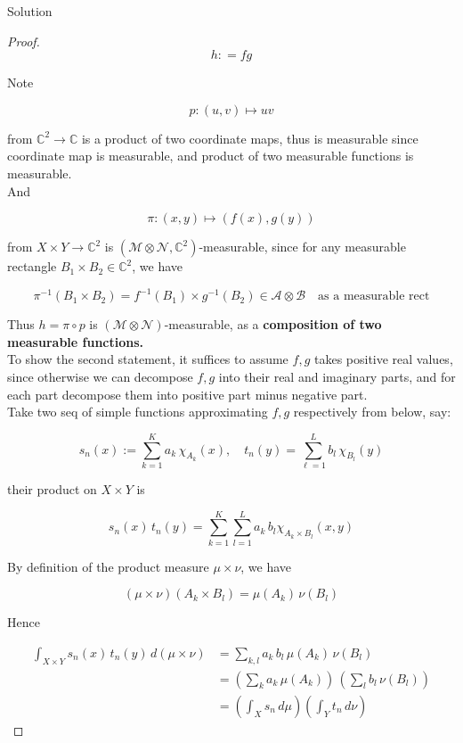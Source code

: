 \documentclass{qlnotes-export}
\begin{document}
\begin{qlsolution}{Solution}
\begin{proof}
\[h: = fg\]

Note

\[p:(u,v)\mapsto uv\]

from \({\mathbb{C}}^{2}\rightarrow{\mathbb{C}}\) is a product of two coordinate maps, thus is measurable since coordinate map is measurable, and product of two measurable functions is measurable.\\
And

\[\pi:(x,y)\mapsto(f(x),g(y))\]

from \(X \times Y\rightarrow{\mathbb{C}}^{2}\) is \((\mathcal{M} \otimes \mathcal{N},{\mathbb{C}}^{2})\)-measurable, since for any measurable rectangle \(B_{1} \times B_{2} \in {\mathbb{C}}^{2}\), we have

\[\pi^{- 1}(B_{1} \times B_{2}) = f^{- 1}(B_{1}) \times g^{- 1}(B_{2}) \in \mathcal{A} \otimes \mathcal{B}\quad\text{as a measurable rect}\]

Thus \(h = \pi \circ p\) is \((\mathcal{M} \otimes \mathcal{N})\)-measurable, as a \textbf{composition of two measurable functions.}\\
To show the second statement, it suffices to assume \(f,g\) takes positive real values, since otherwise we can decompose \(f,g\) into their real and imaginary parts, and for each part decompose them into positive part minus negative part.\\
Take two seq of simple functions approximating \(f,g\) respectively from below, say:

\[s_{n}(x) := \sum\limits_{k = 1}^{K}a_{k}\,\chi_{A_{k}}(x),\quad t_{n}(y) = \sum\limits_{\ell = 1}^{L}b_{l}\,\chi_{B_{l}}(y)\]

their product on \(X \times Y\) is

\[s_{n}(x)\, t_{n}(y) = \sum\limits_{k = 1}^{K}\sum\limits_{l = 1}^{L}a_{k}\, b_{l}\chi_{A_{k} \times B_{l}}(x,y)\]

By definition of the product measure \(\mu \times \nu\), we have

\[(\mu \times \nu)(A_{k} \times B_{l}) = \mu(A_{k})\,\nu(B_{l})\]

Hence

\[\begin{matrix}
{\int_{X \times Y}s_{n}(x)\, t_{n}(y)\, d(\mu \times \nu)} & {= \sum\limits_{k,l}a_{k}\, b_{l}\,\mu(A_{k})\,\nu(B_{l})} \\
 & {= (\sum\limits_{k}a_{k}\,\mu(A_{k}))\,(\sum\limits_{l}b_{l}\,\nu(B_{l}))} \\
 & {= (\int_{X}s_{n}\, d\mu)(\int_{Y}t_{n}\, d\nu)}
\end{matrix}\]


\end{proof}
\end{qlsolution}
\end{document}
